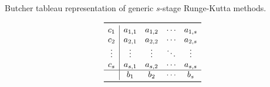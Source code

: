 \begin{table}[htpb]
    \centering
    \caption[Butcher tableau representation of generic $s$-stage Runge-Kutta
    methods]{Butcher tableau representation of generic $s$-stage Runge-Kutta
    methods.}
    \label{tab:generalbutcher}
    \[\renewcommand{\arraystretch}{1}
        \begin{array}{c|cccc}
            \toprule
            c_{1} & a_{1,1} & a_{1,2} & \cdots & a_{1,s}\\
            c_{2} & a_{2,1} & a_{2,2} & \cdots & a_{2,s}\\
            \vdots & \vdots & \vdots & \ddots & \vdots \\
            c_{s} & a_{s,1} & a_{s,2} & \cdots & a_{s,s}\\
            \hline
            & b_{1} & b_{2} & \cdots & b_{s}\\
            \bottomrule
    \end{array}
\]
\end{table}
